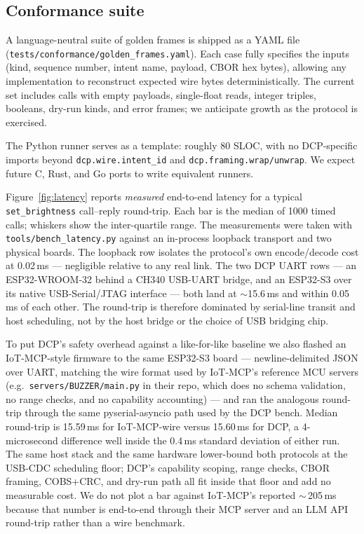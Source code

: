 \documentclass[11pt,a4paper]{article}
\begin{document}
\subsection{Conformance suite}

A language-neutral suite of golden frames is shipped as a YAML file
(\texttt{tests/conformance/golden\_frames.yaml}). Each case fully
specifies the inputs (kind, sequence number, intent name, payload, CBOR
hex bytes), allowing any implementation to reconstruct expected wire
bytes deterministically. The current set includes calls with empty
payloads, single-float reads, integer triples, booleans, dry-run kinds,
and error frames; we anticipate growth as the protocol is exercised.

The Python runner serves as a template: roughly 80 SLOC, with no
DCP-specific imports beyond \texttt{dcp.wire.intent\_id} and
\texttt{dcp.framing.wrap/unwrap}. We expect future C, Rust, and Go ports
to write equivalent runners.

Figure~\ref{fig:latency} reports \emph{measured} end-to-end latency for a
typical \texttt{set\_brightness} call--reply round-trip. Each bar is the
median of 1000 timed calls; whiskers show the inter-quartile range. The
measurements were taken with \texttt{tools/bench\_latency.py} against an
in-process loopback transport and two physical boards. The loopback row
isolates the protocol's own encode/decode cost at 0.02\,ms --- negligible
relative to any real link. The two DCP UART rows --- an ESP32-WROOM-32
behind a CH340 USB-UART bridge, and an ESP32-S3 over its native
USB-Serial/JTAG interface --- both land at $\sim$15.6\,ms and within
0.05\,ms of each other. The round-trip is therefore dominated by
serial-line transit and host scheduling, not by the host bridge or the
choice of USB bridging chip.

To put DCP's safety overhead against a like-for-like baseline we also
flashed an IoT-MCP-style firmware to the same ESP32-S3 board ---
newline-delimited JSON over UART, matching the wire format used by
IoT-MCP's reference MCU servers (e.g.\ \texttt{servers/BUZZER/main.py}
in their repo, which does no schema validation, no range checks, and
no capability accounting) --- and ran the analogous round-trip through
the same pyserial-asyncio path used by the DCP bench. Median
round-trip is 15.59\,ms for IoT-MCP-wire versus 15.60\,ms for DCP, a
4-microsecond difference well inside the 0.4\,ms standard deviation of
either run. The same host stack and the same hardware lower-bound both
protocols at the USB-CDC scheduling floor; DCP's capability scoping,
range checks, CBOR framing, COBS+CRC, and dry-run path all fit inside
that floor and add no measurable cost. We do not plot a bar against
IoT-MCP's reported $\sim$\,205\,ms~\cite{iotmcp2025} because that
number is end-to-end through their MCP server and an LLM API
round-trip rather than a wire benchmark.
\end{document}
